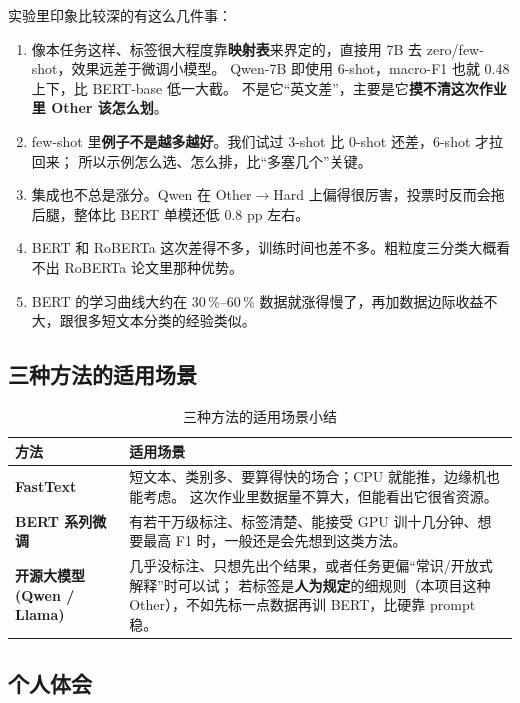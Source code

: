 \documentclass{SYSUReport}
\begin{document}
实验里印象比较深的有这么几件事：

\begin{enumerate}
    \item 像本任务这样、标签很大程度靠\textbf{映射表}来界定的，直接用 7B 去 zero/few-shot，效果远差于微调小模型。
          Qwen-7B 即使用 6-shot，macro-F1 也就 0.48 上下，比 BERT-base 低一大截。
          不是它“英文差”，主要是它\textbf{摸不清这次作业里 Other 该怎么划}。
    \item few-shot 里\textbf{例子不是越多越好}。我们试过 3-shot 比 0-shot 还差，6-shot 才拉回来；
          所以示例怎么选、怎么排，比“多塞几个”关键。
    \item 集成也不总是涨分。Qwen 在 Other$\to$Hard 上偏得很厉害，投票时反而会拖后腿，整体比 BERT 单模还低 0.8 pp 左右。
    \item BERT 和 RoBERTa 这次差得不多，训练时间也差不多。粗粒度三分类大概看不出 RoBERTa 论文里那种优势。
    \item BERT 的学习曲线大约在 30\,\%–60\,\% 数据就涨得慢了，再加数据边际收益不大，跟很多短文本分类的经验类似。
\end{enumerate}

\subsection{三种方法的适用场景}

\begin{table}[!htbp]
\centering
\caption{三种方法的适用场景小结}
\label{tab:scenario}
\begin{tabular}{lp{10cm}}
\toprule
方法 & 适用场景 \\
\midrule
\textbf{FastText}
    & 短文本、类别多、要算得快的场合；CPU 就能推，边缘机也能考虑。
      这次作业里数据量不算大，但能看出它很省资源。 \\
\midrule
\textbf{BERT 系列微调}
    & 有若干万级标注、标签清楚、能接受 GPU 训十几分钟、想要最高 F1 时，一般还是会先想到这类方法。 \\
\midrule
\textbf{开源大模型 (Qwen / Llama)}
    & 几乎没标注、只想先出个结果，或者任务更偏“常识/开放式解释”时可以试；
      若标签是\textbf{人为规定}的细规则（本项目这种 Other），不如先标一点数据再训 BERT，比硬靠 prompt 稳。 \\
\bottomrule
\end{tabular}
\end{table}

\subsection{个人体会}
\end{document}
